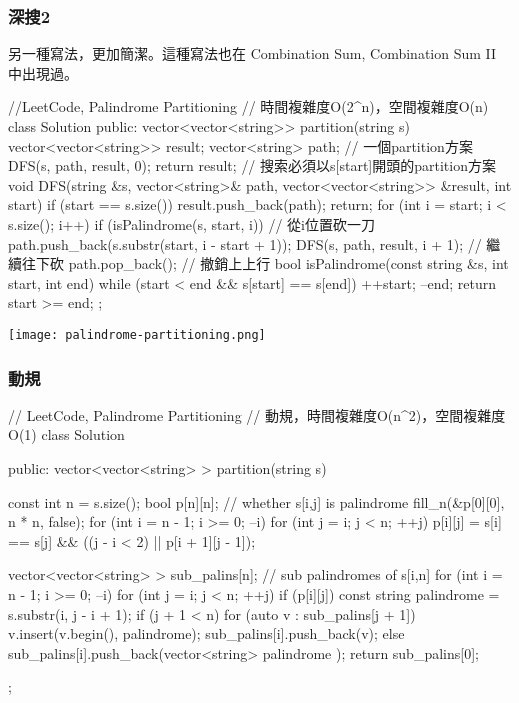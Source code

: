 \subsubsection{深搜2}
另一種寫法，更加簡潔。這種寫法也在 Combination Sum, Combination Sum II 中出現過。
\begin{Code}
//LeetCode, Palindrome Partitioning
// 時間複雜度O(2^n)，空間複雜度O(n)
class Solution {
public:
    vector<vector<string>> partition(string s) {
        vector<vector<string>> result;
        vector<string> path;  // 一個partition方案
        DFS(s, path, result, 0);
        return result;
    }
    // 搜索必須以s[start]開頭的partition方案
    void DFS(string &s, vector<string>& path,
            vector<vector<string>> &result, int start) {
        if (start == s.size()) {
            result.push_back(path);
            return;
        }
        for (int i = start; i < s.size(); i++) {
            if (isPalindrome(s, start, i)) { // 從i位置砍一刀
                path.push_back(s.substr(start, i - start + 1));
                DFS(s, path, result, i + 1);  // 繼續往下砍
                path.pop_back(); // 撤銷上上行
            }
        }
    }
    bool isPalindrome(const string &s, int start, int end) {
        while (start < end && s[start] == s[end]) {
            ++start;
            --end;
        }
        return start >= end;
    }
};
\end{Code}

\begin{center}
\texttt{[image: palindrome-partitioning.png]}\\
\label{fig:palindrome-partitioning}
\end{center}


\subsubsection{動規}
\begin{Code}
// LeetCode, Palindrome Partitioning
// 動規，時間複雜度O(n^2)，空間複雜度O(1)
class Solution {
public:
    vector<vector<string> > partition(string s) {
        const int n = s.size();
        bool p[n][n]; // whether s[i,j] is palindrome
        fill_n(&p[0][0], n * n, false);
        for (int i = n - 1; i >= 0; --i)
            for (int j = i; j < n; ++j)
                p[i][j] = s[i] == s[j] && ((j - i < 2) || p[i + 1][j - 1]);

        vector<vector<string> > sub_palins[n]; // sub palindromes of s[i,n]
        for (int i = n - 1; i >= 0; --i) {
            for (int j = i; j < n; ++j)
                if (p[i][j]) {
                    const string palindrome = s.substr(i, j - i + 1);
                    if (j + 1 < n) {
                        for (auto v : sub_palins[j + 1]) {
                            v.insert(v.begin(), palindrome);
                            sub_palins[i].push_back(v);
                        }
                    } else {
                        sub_palins[i].push_back(vector<string> { palindrome });
                    }
                }
        }
        return sub_palins[0];
    }
};
\end{Code}


